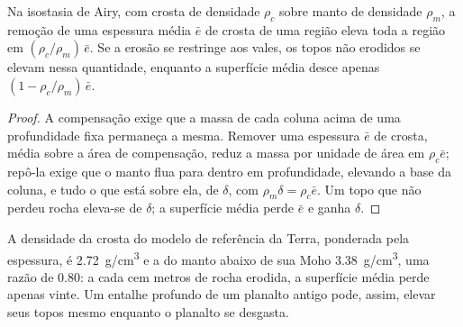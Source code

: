 \begin{proposition}\label{prop:b3:quantitative-geomorphology:rebound}
Na isostasia de Airy, com crosta de densidade $\rho_c$ sobre manto de densidade
$\rho_m$, a remoção de uma espessura média $\bar e$ de crosta de uma região eleva
toda a região em $(\rho_c/\rho_m)\,\bar e$. Se a erosão se restringe
aos vales, os topos não erodidos se elevam nessa quantidade, enquanto a
superfície média desce apenas $(1 - \rho_c/\rho_m)\,\bar e$.
\end{proposition}

\begin{proof}
A compensação exige que a massa de cada coluna acima de uma profundidade fixa permaneça
a mesma. Remover uma espessura $\bar e$ de crosta, média sobre a área
de compensação, reduz a massa por unidade de área em $\rho_c \bar e$;
repô-la exige que o manto flua para dentro em profundidade, elevando a base da
coluna, e tudo o que está sobre ela, de $\delta$, com $\rho_m \delta = \rho_c \bar
e$. Um topo que não perdeu rocha eleva-se de $\delta$; a superfície média perde
$\bar e$ e ganha $\delta$.
\end{proof}

A densidade da crosta do modelo de referência da Terra, ponderada pela espessura, é
\qty{2.72}{g/cm^3} e a do manto abaixo de sua Moho \qty{3.38}{g/cm^3},
uma razão de 0.80: a cada cem metros de rocha erodida, a superfície média
perde apenas vinte. Um entalhe profundo de um planalto antigo pode, assim, elevar seus
topos mesmo enquanto o planalto se desgasta.

